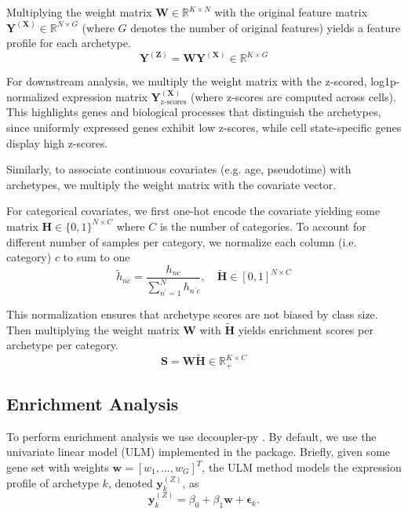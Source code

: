 \documentclass[oneside]{article}
\begin{document}
Multiplying the weight matrix $\mathbf{W} \in \mathbb{R}^{K \times N}$ with the original feature matrix $\mathbf{Y}^{(\mathbf{X})} \in \mathbb{R}^{N \times G}$ (where $G$ denotes the number of original features) yields a feature profile for each archetype.
\begin{equation}
    \mathbf{Y}^{(\mathbf{Z})} = \mathbf{W} \mathbf{Y}^{(\mathbf{X})} \in \mathbb{R}^{K \times G}
\end{equation}

For downstream analysis, we multiply the weight matrix with the z-scored, log1p-normalized expression matrix $\mathbf{Y}^{(\mathbf{X})}_{\text{z-scores}}$ (where z-scores are computed across cells). This highlights genes and biological processes that distinguish the archetypes, since uniformly expressed genes exhibit low z-scores, while cell state-specific genes display high z-scores.

Similarly, to associate continuous covariates (e.g. age, pseudotime) with archetypes, we multiply the weight matrix with the covariate vector.

For categorical covariates, we first one-hot encode the covariate yielding some matrix $\mathbf{H} \in \{0, 1\}^{N \times C}$ where $C$ is the number of categories. To account for different number of samples per category, we normalize each column (i.e. category) $c$ to sum to one
\begin{equation}
    \tilde{h}_{nc} = \frac{h_{nc}}{\sum_{n^\prime=1}^N h_{n^\prime c}}, \quad \tilde{\mathbf{H}} \in [0, 1]^{N \times C}
\end{equation}

This normalization ensures that archetype scores are not biased by class size. Then multiplying the weight matrix $\mathbf{W}$ with $\tilde{\mathbf{H}}$ yields enrichment scores per archetype per category.
\begin{equation}
    \mathbf{S} = \mathbf{W} \tilde{\mathbf{H}} \in \mathbb{R}_+^{K \times C}
\end{equation}

\subsection{Enrichment Analysis}

To perform enrichment analysis we use decoupler-py \autocite{badiaDecoupler2022}. By default, we use the univariate linear model (ULM) implemented in the package. Briefly, given some gene set with weights $\mathbf{w} = \left[w_1, ..., w_G\right]^T$, the ULM method models the expression profile of archetype $k$, denoted $\mathbf{y}^{(Z)}_{k}$, as
\begin{equation}
    \mathbf{y}^{(Z)}_{k} = \beta_0 + \beta_1 \mathbf{w} + \mathbf{\epsilon}_{k}.
\end{equation}
\end{document}
